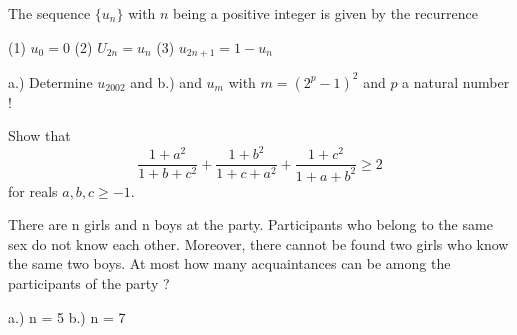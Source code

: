 \bq{}{}
The sequence $\{u_n\}$ with $n$ being a positive integer is given by the recurrence

(1) $u_{0} = 0$
(2) $U_{2n} = u_{n}$
(3) $u_{2n+1} = 1 - u_{n}$

a.) Determine $u_{2002}$ and
b.) and $u_{m}$ with $m = (2^p-1)^2$ and $p$ a natural number !
\eq


\eq

\bq{}{}
Show that
\[\frac{1+a^2}{1+b+c^2}+\frac{1+b^2}{1+c+a^2} +\frac{1+c^2}{1+a+b^2} \geq 2\]
for reals $a,b,c \geq -1$.
\eq

\bq{}{}
There are n girls and n boys at the party. Participants who belong to the same sex do not know each other. Moreover, there cannot be found two girls who know the same two boys. At most how many acquaintances can be among the participants of the party ?

a.) n = 5
b.) n = 7
\eq